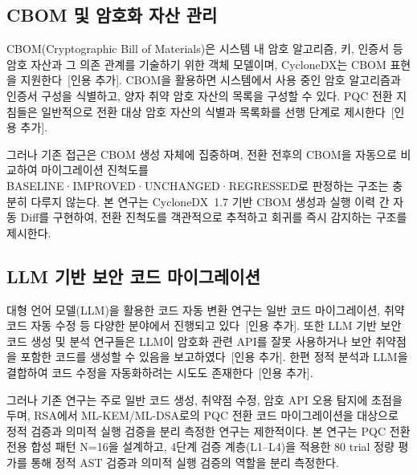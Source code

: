 \subsection{CBOM 및 암호화 자산 관리}

CBOM(Cryptographic Bill of Materials)은 시스템 내 암호 알고리즘, 키, 인증서 등 암호 자산과 그 의존 관계를 기술하기 위한 객체 모델이며, CycloneDX는 CBOM 표현을 지원한다~[인용 추가].
CBOM을 활용하면 시스템에서 사용 중인 암호 알고리즘과 인증서 구성을 식별하고, 양자 취약 암호 자산의 목록을 구성할 수 있다.
PQC 전환 지침들은 일반적으로 전환 대상 암호 자산의 식별과 목록화를 선행 단계로 제시한다~[인용 추가].

그러나 기존 접근은 CBOM 생성 자체에 집중하며, 전환 전후의 CBOM을 자동으로 비교하여 마이그레이션 진척도를 BASELINE·IMPROVED·UNCHANGED·REGRESSED로 판정하는 구조는 충분히 다루지 않는다.
본 연구는 CycloneDX~1.7 기반 CBOM 생성과 실행 이력 간 자동 Diff를 구현하여, 전환 진척도를 객관적으로 추적하고 회귀를 즉시 감지하는 구조를 제시한다.

\subsection{LLM 기반 보안 코드 마이그레이션}

대형 언어 모델(LLM)을 활용한 코드 자동 변환 연구는 일반 코드 마이그레이션, 취약 코드 자동 수정 등 다양한 분야에서 진행되고 있다~[인용 추가].
또한 LLM 기반 보안 코드 생성 및 분석 연구들은 LLM이 암호화 관련 API를 잘못 사용하거나 보안 취약점을 포함한 코드를 생성할 수 있음을 보고하였다~[인용 추가].
한편 정적 분석과 LLM을 결합하여 코드 수정을 자동화하려는 시도도 존재한다~[인용 추가].

그러나 기존 연구는 주로 일반 코드 생성, 취약점 수정, 암호 API 오용 탐지에 초점을 두며, RSA에서 ML-KEM/ML-DSA로의 PQC 전환 코드 마이그레이션을 대상으로 정적 검증과 의미적 실행 검증을 분리 측정한 연구는 제한적이다.
본 연구는 PQC 전환 전용 합성 패턴 N=16을 설계하고, 4단계 검증 계층(L1--L4)을 적용한 80 trial 정량 평가를 통해 정적 AST 검증과 의미적 실행 검증의 역할을 분리 측정한다.